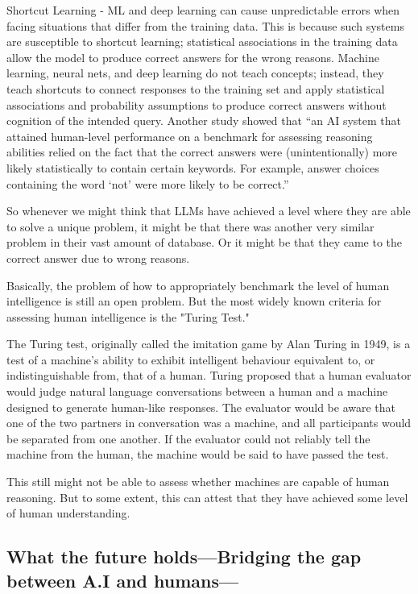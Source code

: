 Shortcut Learning - ML and deep learning can cause unpredictable errors when facing situations that differ from the training data. This is because such systems are susceptible to shortcut learning; statistical associations in the training data allow the model to produce correct answers for the wrong reasons. Machine learning, neural nets, and deep learning do not teach concepts; instead, they teach shortcuts to connect responses to the training set and apply statistical associations and probability assumptions to produce correct answers without cognition of the intended query. Another study showed that “an AI system that attained human-level performance on a benchmark for assessing reasoning abilities relied on the fact that the correct answers were (unintentionally) more likely statistically to contain certain keywords. For example, answer choices containing the word ‘not’ were more likely to be correct.”

So whenever we might think that LLMs have achieved a level where they are able to solve a unique problem, it might be that there was another very similar problem in their vast amount of database. Or it might be that they came to the correct answer due to wrong reasons.

Basically, the problem of how to appropriately benchmark the level of human intelligence is still an open problem. But the most widely known criteria for assessing human intelligence is the "Turing Test."

The Turing test, originally called the imitation game by Alan Turing in 1949, is a test of a machine's ability to exhibit intelligent behaviour equivalent to, or indistinguishable from, that of a human. Turing proposed that a human evaluator would judge natural language conversations between a human and a machine designed to generate human-like responses. The evaluator would be aware that one of the two partners in conversation was a machine, and all participants would be separated from one another. If the evaluator could not reliably tell the machine from the human, the machine would be said to have passed the test.

This still might not be able to assess whether machines are capable of human reasoning. But to some extent, this can attest that they have achieved some level of human understanding.


\subsection{What the future holds—Bridging the gap between A.I and humans—}

